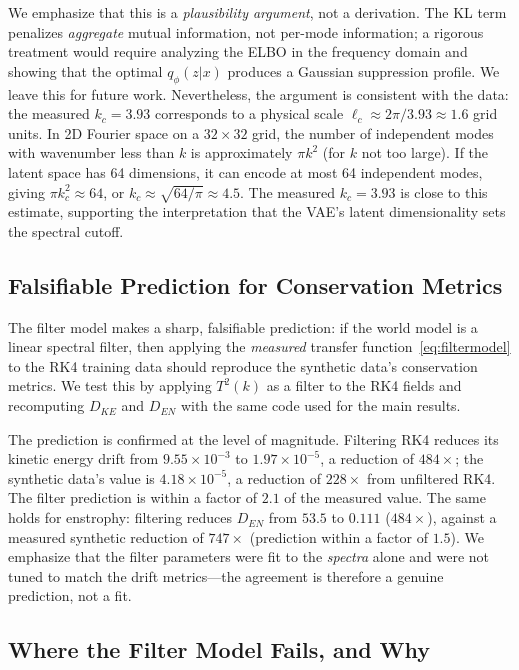 \documentclass[reprint,aps,pre]{revtex4-2}
\begin{document}
We emphasize that this is a \textit{plausibility argument}, not a derivation. The KL term penalizes \textit{aggregate} mutual information, not per-mode information; a rigorous treatment would require analyzing the ELBO in the frequency domain and showing that the optimal $q_\phi(z|x)$ produces a Gaussian suppression profile. We leave this for future work. Nevertheless, the argument is consistent with the data: the measured $k_c = 3.93$ corresponds to a physical scale $\ell_c \approx 2\pi/3.93 \approx 1.6$ grid units. In 2D Fourier space on a $32\times32$ grid, the number of independent modes with wavenumber less than $k$ is approximately $\pi k^2$ (for $k$ not too large). If the latent space has 64 dimensions, it can encode at most 64 independent modes, giving $\pi k_c^2 \approx 64$, or $k_c \approx \sqrt{64/\pi} \approx 4.5$. The measured $k_c = 3.93$ is close to this estimate, supporting the interpretation that the VAE's latent dimensionality sets the spectral cutoff.

\subsection{Falsifiable Prediction for Conservation Metrics}

The filter model makes a sharp, falsifiable prediction: if the world model is a linear spectral filter, then applying the \textit{measured} transfer function~\eqref{eq:filtermodel} to the RK4 training data should reproduce the synthetic data's conservation metrics. We test this by applying $T^2(k)$ as a filter to the RK4 fields and recomputing $D_{KE}$ and $D_{EN}$ with the same code used for the main results.

The prediction is confirmed at the level of magnitude. Filtering RK4 reduces its kinetic energy drift from $9.55 \times 10^{-3}$ to $1.97 \times 10^{-5}$, a reduction of $484\times$; the synthetic data's value is $4.18 \times 10^{-5}$, a reduction of $228\times$ from unfiltered RK4. The filter prediction is within a factor of $2.1$ of the measured value. The same holds for enstrophy: filtering reduces $D_{EN}$ from $53.5$ to $0.111$ ($484\times$), against a measured synthetic reduction of $747\times$ (prediction within a factor of $1.5$). We emphasize that the filter parameters were fit to the \textit{spectra} alone and were not tuned to match the drift metrics---the agreement is therefore a genuine prediction, not a fit.

\subsection{Where the Filter Model Fails, and Why}
\end{document}

